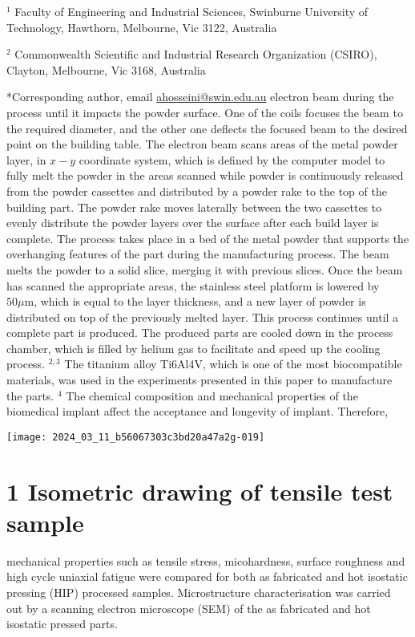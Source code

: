 \documentclass[10pt]{article}
\begin{document}
${ }^{1}$ Faculty of Engineering and Industrial Sciences, Swinburne University of Technology, Hawthorn, Melbourne, Vic 3122, Australia

${ }^{2}$ Commonwealth Scientific and Industrial Research Organization (CSIRO), Clayton, Melbourne, Vic 3168, Australia

*Corresponding author, email \href{mailto:ahosseini@swin.edu.au}{ahosseini@swin.edu.au} electron beam during the process until it impacts the powder surface. One of the coils focuses the beam to the required diameter, and the other one deflects the focused beam to the desired point on the building table. The electron beam scans areas of the metal powder layer, in $x-y$ coordinate system, which is defined by the computer model to fully melt the powder in the areas scanned while powder is continuously released from the powder cassettes and distributed by a powder rake to the top of the building part. The powder rake moves laterally between the two cassettes to evenly distribute the powder layers over the surface after each build layer is complete. The process takes place in a bed of the metal powder that supports the overhanging features of the part during the manufacturing process. The beam melts the powder to a solid slice, merging it with previous slices. Once the beam has scanned the appropriate areas, the stainless steel platform is lowered by $50 \mu \mathrm{m}$, which is equal to the layer thickness, and a new layer of powder is distributed on top of the previously melted layer. This process continues until a complete part is produced. The produced parts are cooled down in the process chamber, which is filled by helium gas to facilitate and speed up the cooling process. ${ }^{2,3}$ The titanium alloy Ti6Al4V, which is one of the most biocompatible materials, was used in the experiments presented in this paper to manufacture the parts. ${ }^{4}$ The chemical composition and mechanical properties of the biomedical implant affect the acceptance and longevity of implant. Therefore,

\begin{center}
\texttt{[image: 2024\_03\_11\_b56067303c3bd20a47a2g-019]}
\end{center}

\section*{1 Isometric drawing of tensile test sample}
mechanical properties such as tensile stress, micohardness, surface roughness and high cycle uniaxial fatigue were compared for both as fabricated and hot isostatic pressing (HIP) processed samples. Microstructure characterisation was carried out by a scanning electron microscope (SEM) of the as fabricated and hot isostatic pressed parts.
\end{document}

